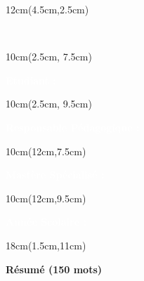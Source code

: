 \begin{titlepage}
    \thispagestyle{empty}

    

    \begin{textblock*}{12cm}(4.5cm,2.5cm)
        \begin{LARGE}
            \makeatletter
            \justifying
            \begin{center}
                \textbf{\textcolor{white}{\jobposition}}
                \\
                \textbf{\textcolor{white}{\thetitle}}
            \end{center}
            \makeatother
        \end{LARGE}
    \end{textblock*}

    \begin{textblock*}{10cm}(2.5cm, 7.5cm)
        \raggedright
        \large
        \textbf{\textcolor{white}{Etudiant :}}
        \\
        \textbf{\textcolor{white}{\theauthor}}
    \end{textblock*}

    \begin{textblock*}{10cm}(2.5cm, 9.5cm)
        \raggedright
        \large
        \textbf{\textcolor{white}{Responsable Pédagogique :}}
        \\
        \textbf{\textcolor{white}{\theRPeda}}
    \end{textblock*}


    \begin{textblock*}{10cm}(12cm,7.5cm)
        \raggedright
        \large
        \textbf{\textcolor{white}{Mastère Spécialisé :}}
        \\
        \begin{raggedleft}
            \textcolor{white}{\theUE}
        \end{raggedleft}
    \end{textblock*}

    \begin{textblock*}{10cm}(12cm,9.5cm)
        \large
        \raggedright
        \textbf{\textcolor{white}{Année Scolaire :}}
        \\
        \textcolor{white}{\theSemestre}
    \end{textblock*}

    \begin{textblock*}{18cm}(1.5cm,11cm)
        \begin{center}
            \normalsize
            \textbf{\textcolor{bleuRoiUTT}{Résumé (150 mots)}}
        \end{center}
    \end{textblock*}


\end{titlepage}
